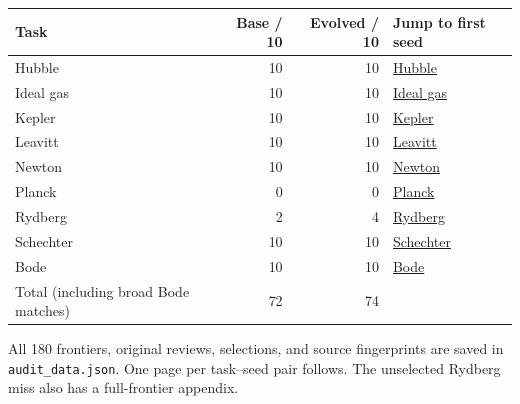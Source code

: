 \documentclass[10pt,letterpaper,landscape]{article}
\begin{document}
\begin{center}\begin{tabular}{lrrl}\toprule
Task & Base / 10 & Evolved / 10 & Jump to first seed \\\midrule
Hubble & 10 & 10 & \hyperref[hubble-10000]{Hubble} \\
Ideal gas & 10 & 10 & \hyperref[ideal_gas-10000]{Ideal gas} \\
Kepler & 10 & 10 & \hyperref[kepler-10000]{Kepler} \\
Leavitt & 10 & 10 & \hyperref[leavitt-10000]{Leavitt} \\
Newton & 10 & 10 & \hyperref[newton-10000]{Newton} \\
Planck & 0 & 0 & \hyperref[planck-10000]{Planck} \\
Rydberg & 2 & 4 & \hyperref[rydberg-10000]{Rydberg} \\
Schechter & 10 & 10 & \hyperref[schechter-10000]{Schechter} \\
Bode & 10 & 10 & \hyperref[bode-10000]{Bode} \\
\midrule Total (including broad Bode matches) & 72 & 74 & \\\bottomrule\end{tabular}\end{center}
All 180 frontiers, original reviews, selections, and source fingerprints are saved in \texttt{audit\_data.json}. One page per task--seed pair follows. The unselected Rydberg miss also has a full-frontier appendix.
\clearpage{}\label{hubble-10000}
\end{document}
